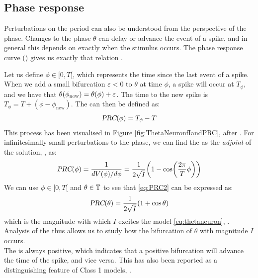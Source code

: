 \subsection{Phase response} \label{sec:TheThetaNeuronModelPhaseResponse}
Perturbations on the period can also be understood from the perspective of the phase. Changes to the phase $\theta$ can delay or advance the event of a spike, and in general this depends on exactly when the stimulus occurs. The phase response curve (\PRC) gives us exactly that relation \cite{Perez2020, Gutkin2014}.

Let us define $\phi \in [0, T[$, which represents the time since the last event of a spike. When we add a small bifurcation $\varepsilon < 0 $ to $\theta$ at time $\phi$, a spike will occur at $T_{\phi}$, and we have that $\theta(\phi_{\rm new}) = \theta(\phi) + \varepsilon$. The time to the new spike is $T_{\phi} = T + (\phi - \phi_{\text{new}})$. The \PRC can then be defined as:
\begin{align}
{\textsl{PRC}}(\phi) =T_{\phi} - T \label{eq:PRC1}
\end{align}
This process has been visualised in Figure \ref{fig:ThetaNeuronfIandPRC}, after \cite{Perez2020}. For infinitesimally small perturbations to the phase, we can find the \PRC as the \textsl{adjoint} of the solution, \cite{Gutkin2014}, as:
\begin{align}
\PRC(\phi) = \frac{1}{d V(\phi) / d \phi} = \frac{1}{2 \sqrt{I}} \left(1-\cos \left( \frac{2 \pi}{T} \phi \right) \right) \label{eq:PRC2}
\end{align}
We can use $\phi \in [0, T[$ and $\theta \in {\mathbb{T}}$ to see that \eqref{eq:PRC2} can be expressed as:
\begin{align}
\PRC(\theta) = \frac{1}{2 \sqrt{I}} \left( 1 + \cos \theta \right) \label{eq:PRC3}
\end{align}
which is the magnitude with which $I$ excites the model \eqref{eq:thetaneuron}, \cite{Ermentrout1996}. Analysis of the \PRC thus allows us to study how the bifurcation of $\theta$ with magnitude $I$ occurs.\\

The \PRC is always positive, which indicates that a positive bifurcation will advance the time of the spike, and vice versa. This has also been reported as a distinguishing feature of Class 1 models, \cite{Ermentrout1996}.


